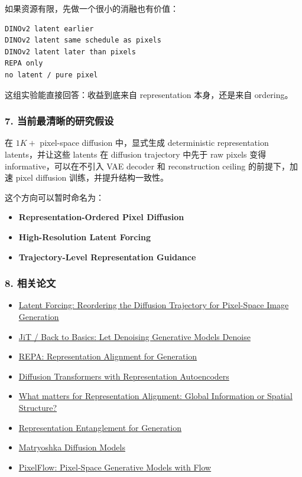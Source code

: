 如果资源有限，先做一个很小的消融也有价值：
\begin{lstlisting}[language={},basicstyle=\ttfamily\small]
DINOv2 latent earlier
DINOv2 latent same schedule as pixels
DINOv2 latent later than pixels
REPA only
no latent / pure pixel
\end{lstlisting}

这组实验能直接回答：收益到底来自 representation 本身，还是来自 ordering。

\subsubsection*{7. 当前最清晰的研究假设}

\begin{summarybox}
在 $1K+$ pixel-space diffusion 中，显式生成 deterministic representation latents，并让这些 latents 在 diffusion trajectory 中先于 raw pixels 变得 informative，可以在不引入 VAE decoder 和 reconstruction ceiling 的前提下，加速 pixel diffusion 训练，并提升结构一致性。
\end{summarybox}

这个方向可以暂时命名为：
\begin{itemize}[leftmargin=1.5em]
  \item \textbf{Representation-Ordered Pixel Diffusion}
  \item \textbf{High-Resolution Latent Forcing}
  \item \textbf{Trajectory-Level Representation Guidance}
\end{itemize}

\subsubsection*{8. 相关论文}

\begin{itemize}[leftmargin=1.5em]
  \item \href{https://arxiv.org/abs/2602.11401}{Latent Forcing: Reordering the Diffusion Trajectory for Pixel-Space Image Generation}
  \item \href{https://arxiv.org/abs/2511.13720}{JiT / Back to Basics: Let Denoising Generative Models Denoise}
  \item \href{https://arxiv.org/abs/2410.06940}{REPA: Representation Alignment for Generation}
  \item \href{https://arxiv.org/abs/2510.11690}{Diffusion Transformers with Representation Autoencoders}
  \item \href{https://arxiv.org/abs/2512.10794}{What matters for Representation Alignment: Global Information or Spatial Structure?}
  \item \href{https://arxiv.org/abs/2507.01467}{Representation Entanglement for Generation}
  \item \href{https://arxiv.org/abs/2310.15111}{Matryoshka Diffusion Models}
  \item \href{https://arxiv.org/abs/2504.07963}{PixelFlow: Pixel-Space Generative Models with Flow}
\end{itemize}
